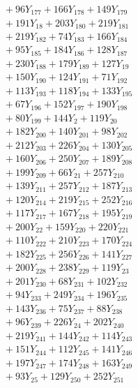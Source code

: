 \documentclass[a4paper,10pt]{article}
\begin{document}
{\begin{align}
&\quad  + 96Y_{177} + 166Y_{178} + 149Y_{179} \\[0.5ex]
&\quad  + 191Y_{18} + 203Y_{180} + 219Y_{181} \\[0.5ex]
&\quad  + 219Y_{182} + 74Y_{183} + 166Y_{184} \\[0.5ex]
&\quad  + 95Y_{185} + 184Y_{186} + 128Y_{187} \\[0.5ex]
&\quad  + 230Y_{188} + 179Y_{189} + 127Y_{19} \\[0.5ex]
&\quad  + 150Y_{190} + 124Y_{191} + 71Y_{192} \\[0.5ex]
&\quad  + 113Y_{193} + 118Y_{194} + 133Y_{195} \\[0.5ex]
&\quad  + 67Y_{196} + 152Y_{197} + 190Y_{198} \\[0.5ex]
&\quad  + 80Y_{199} + 144Y_{2} + 119Y_{20} \\[0.5ex]
&\quad  + 182Y_{200} + 140Y_{201} + 98Y_{202} \\[0.5ex]
&\quad  + 212Y_{203} + 226Y_{204} + 130Y_{205} \\[0.5ex]
&\quad  + 160Y_{206} + 250Y_{207} + 189Y_{208} \\[0.5ex]
&\quad  + 199Y_{209} + 66Y_{21} + 257Y_{210} \\[0.5ex]
&\quad  + 139Y_{211} + 257Y_{212} + 187Y_{213} \\[0.5ex]
&\quad  + 120Y_{214} + 219Y_{215} + 252Y_{216} \\[0.5ex]
&\quad  + 117Y_{217} + 167Y_{218} + 195Y_{219} \\[0.5ex]
&\quad  + 200Y_{22} + 159Y_{220} + 220Y_{221} \\[0.5ex]
&\quad  + 110Y_{222} + 210Y_{223} + 170Y_{224} \\[0.5ex]
&\quad  + 182Y_{225} + 256Y_{226} + 141Y_{227} \\[0.5ex]
&\quad  + 200Y_{228} + 238Y_{229} + 119Y_{23} \\[0.5ex]
&\quad  + 201Y_{230} + 68Y_{231} + 102Y_{232} \\[0.5ex]
&\quad  + 94Y_{233} + 249Y_{234} + 196Y_{235} \\[0.5ex]
&\quad  + 143Y_{236} + 75Y_{237} + 88Y_{238} \\[0.5ex]
&\quad  + 96Y_{239} + 226Y_{24} + 202Y_{240} \\[0.5ex]
&\quad  + 219Y_{241} + 144Y_{242} + 114Y_{243} \\[0.5ex]
&\quad  + 151Y_{244} + 112Y_{245} + 141Y_{246} \\[0.5ex]
&\quad  + 197Y_{247} + 174Y_{248} + 163Y_{249} \\[0.5ex]
&\quad  + 93Y_{25} + 129Y_{250} + 252Y_{251} \\[0.5ex]

\end{align}}
\end{document}
